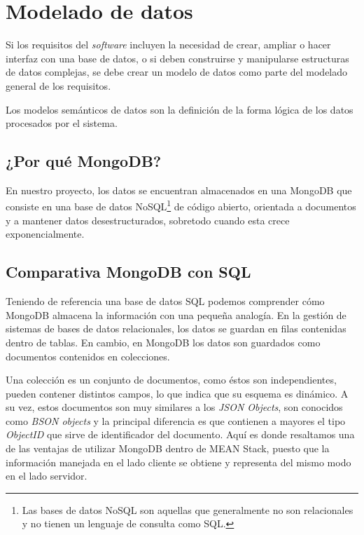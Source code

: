 
\section{Modelado de datos}
Si los requisitos del \textit{software} incluyen la necesidad de crear, ampliar o hacer interfaz con una base de datos, o si deben construirse y manipularse estructuras de datos complejas, se debe crear un modelo de datos como parte del modelado general de los requisitos\cite{pressman}.


Los modelos semánticos de datos son la definición de la forma lógica de los datos procesados por el sistema\cite{sommerville}. 


\subsection{¿Por qué MongoDB?}
En nuestro proyecto, los datos se encuentran almacenados en una MongoDB que consiste en una base de datos NoSQL\footnote{Las bases de datos NoSQL son aquellas que generalmente no son relacionales y no tienen un lenguaje de consulta como SQL.} de código abierto, orientada a documentos y a mantener datos desestructurados, sobretodo cuando esta crece exponencialmente\cite{mongodb_traspas}. 

\subsection{Comparativa MongoDB con SQL}
Teniendo de referencia una base de datos SQL podemos comprender cómo MongoDB almacena la información con una pequeña analogía. En la gestión de sistemas de bases de datos relacionales, los datos se guardan en filas contenidas dentro de tablas. En cambio, en MongoDB los datos son guardados como documentos contenidos en colecciones.


Una colección es un conjunto de documentos, como éstos son independientes, pueden contener distintos campos, lo que indica que su esquema es dinámico. A su vez, estos documentos son muy similares a los \textit{JSON Objects}, son conocidos como \textit{BSON objects} y la principal diferencia es que contienen a mayores el tipo \textit{ObjectID} que sirve de identificador del documento. Aquí es donde resaltamos una de las ventajas de utilizar MongoDB dentro de MEAN Stack, puesto que la información manejada en el lado cliente se obtiene y representa del mismo modo en el lado servidor.


